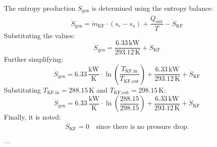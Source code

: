 The entropy production \( \dot{S}_{\text{gen}} \) is determined using the entropy balance:  
\[
\dot{S}_{\text{gen}} = \dot{m}_{\text{KF}} \cdot (s_e - s_a) + \frac{\dot{Q}_{\text{out}}}{T} - \dot{S}_{\text{KF}}
\]  
Substituting the values:  
\[
\dot{S}_{\text{gen}} = \frac{6.33 \, \text{kW}}{293.12 \, \text{K}} + \dot{S}_{\text{KF}}
\]  
Further simplifying:  
\[
\dot{S}_{\text{gen}} = 6.33 \, \frac{\text{kW}}{\text{K}} \cdot \ln \left( \frac{T_{\text{KF,in}}}{T_{\text{KF,out}}} \right) + \frac{6.33 \, \text{kW}}{293.12 \, \text{K}} + \dot{S}_{\text{KF}}
\]  
Substituting \( T_{\text{KF,in}} = 288.15 \, \text{K} \) and \( T_{\text{KF,out}} = 298.15 \, \text{K} \):  
\[
\dot{S}_{\text{gen}} = 6.33 \, \frac{\text{kW}}{\text{K}} \cdot \ln \left( \frac{288.15}{298.15} \right) + \frac{6.33 \, \text{kW}}{293.12 \, \text{K}} + \dot{S}_{\text{KF}}
\]  
Finally, it is noted:  
\[
\dot{S}_{\text{KF}} = 0 \quad \text{since there is no pressure drop.}
\]  

---